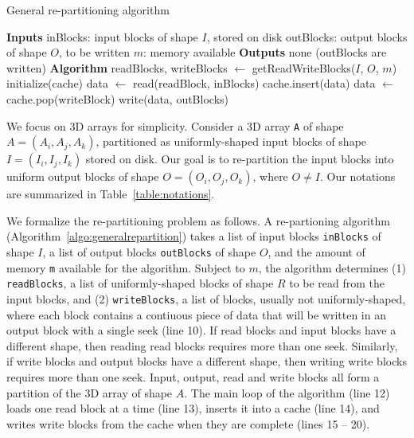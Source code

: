 \documentclass[sigconf, nonacm]{acmart}
\begin{document}
\begin{algorithm}
  \caption{General re-partitioning algorithm}
  \label{algo:generalrepartition}
  \begin{algorithmic}[1]
    \STATE \textbf{Inputs}
    \STATE inBlocks: input blocks of shape $I$, stored on disk
    \STATE outBlocks: output blocks of shape $O$, to be written
    \STATE $m$: memory available
    \STATE
    \STATE \textbf{Outputs}
    \STATE none (outBlocks are written)
    \STATE
    \STATE \textbf{Algorithm}
    \STATE readBlocks, writeBlocks $\leftarrow$ getReadWriteBlocks($I$, $O$, $m$)
    \STATE initialize(cache)
      \STATE data $\leftarrow$ read(readBlock, inBlocks)
      \STATE cache.insert(data)
          \STATE data $\leftarrow$ cache.pop(writeBlock)
          \STATE write(data, outBlocks)
        \ENDIF
      \ENDFOR
    \ENDFOR

  \end{algorithmic}
\end{algorithm}

We focus on 3D arrays for simplicity. Consider a 3D array \texttt{A} of shape $A =
(A_i, A_j, A_k)$, partitioned as uniformly-shaped input blocks of shape $I =
(I_i, I_j, I_k)$ stored on disk. Our goal is to re-partition the input
blocks into uniform output blocks of shape $O = (O_i, O_j, O_k)$,
where $O \neq I$. Our notations are summarized in
Table~\ref{table:notations}.

We formalize the re-partitioning problem as follows.
A re-partioning algorithm (Algorithm~\ref{algo:generalrepartition}) takes a
list of input blocks \texttt{inBlocks} of shape $I$, a list of output
blocks \texttt{outBlocks} of shape $O$, and the amount of memory \texttt{m}
available for the algorithm. Subject to $m$, the algorithm determines (1)
\texttt{readBlocks}, a list of uniformly-shaped blocks of shape $R$ to be read from the
input blocks, and (2) \texttt{writeBlocks}, a list of blocks,
usually not uniformly-shaped, where each block contains a contiuous piece of
data that will be written in an output block with a single seek (line 10).
If read blocks and input blocks have a different shape, then reading read blocks requires
more than one seek. Similarly, if write blocks and output blocks have a different shape,
then writing write blocks requires more than one seek. Input, output, read
and write blocks all form a partition of the 3D array of shape $A$. The
main loop of the algorithm (line 12) loads one read block at a time (line
13), inserts it into a cache (line 14), and writes write blocks from the
cache when they are complete (lines 15 -- 20).
\end{document}
